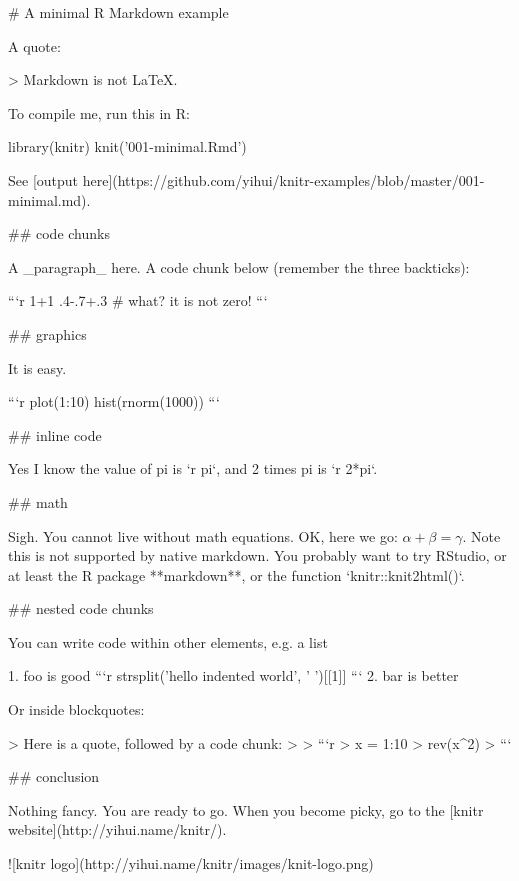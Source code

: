 # A minimal R Markdown example

A quote:

> Markdown is not LaTeX.

To compile me, run this in R:

    library(knitr)
    knit('001-minimal.Rmd')

See [output here](https://github.com/yihui/knitr-examples/blob/master/001-minimal.md).

## code chunks

A _paragraph_ here. A code chunk below (remember the three backticks):

```{r}
1+1
.4-.7+.3 # what? it is not zero!
```

## graphics

It is easy.

```{r}
plot(1:10)
hist(rnorm(1000))
```

## inline code

Yes I know the value of pi is `r pi`, and 2 times pi is `r 2*pi`.

## math

Sigh. You cannot live without math equations. OK, here we go: $\alpha+\beta=\gamma$. Note this is not supported by native markdown. You probably want to try RStudio, or at least the R package **markdown**, or the function `knitr::knit2html()`.

## nested code chunks

You can write code within other elements, e.g. a list

1. foo is good
    ```{r}
    strsplit('hello indented world', ' ')[[1]]
    ```
2. bar is better

Or inside blockquotes:

> Here is a quote, followed by a code chunk:
>
> ```{r}
> x = 1:10
> rev(x^2)
> ```

## conclusion

Nothing fancy. You are ready to go. When you become picky, go to the [knitr website](http://yihui.name/knitr/).

![knitr logo](http://yihui.name/knitr/images/knit-logo.png)

